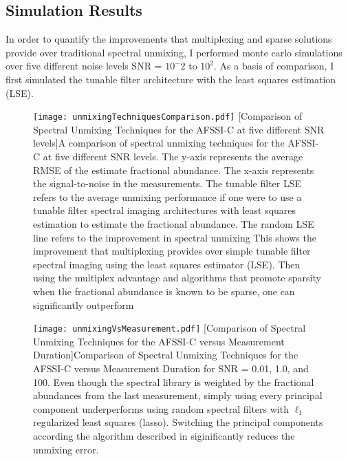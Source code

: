 \subsection{Simulation Results}

In order to quantify the improvements that multiplexing and sparse solutions provide over traditional spectral unmixing, I performed monte carlo simulations over five different noise levels SNR = $10^-2$ to $10^2$. As a basis of comparison, I first simulated the tunable filter architecture with the least squares estimation (LSE).


\begin{figure}
	\centering
	\texttt{[image: unmixingTechniquesComparison.pdf]}
	[Comparison of Spectral Unmixing Techniques for the AFSSI-C at five different SNR levels]{A comparison of spectral unmixing techniques for the AFSSI-C at five different SNR levels. The y-axis represents the average RMSE of the estimate fractional abundance. The x-axis represents the signal-to-noise in the measurements. The tunable filter LSE refers to the average unmixing performance if one were to use a tunable filter spectral imaging architectures with least squares estimation to estimate the fractional abundance. The random LSE line refers to the improvement in spectral unmixing This shows the improvement that multiplexing provides over simple tunable filter spectral imaging using the least squares estimator (LSE). Then using the multiplex advantage and algorithms that promote sparsity when the fractional abundance is known to be sparse, one can significantly outperform }
	\label{fig:unmixingTechniquesComparison}
\end{figure}


\begin{figure}
	\centering
	\texttt{[image: unmixingVsMeasurement.pdf]}
	[Comparison of Spectral Unmixing Techniques for the AFSSI-C versus Measurement Duration]{Comparison of Spectral Unmixing Techniques for the AFSSI-C versus Measurement Duration for SNR = 0.01, 1.0, and 100. Even though the spectral library is weighted by the fractional abundances from the last measurement, simply using every principal component underperforms using random spectral filters with $\ell_1$ regularized least squares (lasso). Switching the principal components according the algorithm described in  siginificantly reduces the unmixing error. }
	\label{fig:unmixingVsMeasurement}
\end{figure}


